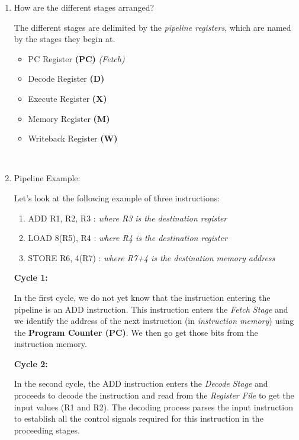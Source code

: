 \documentclass[12pt]{article}
\newenvironment{QandA}{\begin{enumerate}[label=\bfseries\arabic*.]\bfseries}
                      {\end{enumerate}}
\newenvironment{answered}{\par\quad\normalfont}{}
\begin{document}
\begin{QandA}
    \
    
    \item How are the different stages arranged?
    \begin{answered}
    The different stages are delimited by the \textit{pipeline registers}, which are named by the stages they begin at.
    \begin{itemize}
        \item PC Register \textbf{(PC)} \textit{(Fetch)}
        \item Decode Register \textbf{(D)}
        \item Execute Register \textbf{(X)}
        \item Memory Register \textbf{(M)}
        \item Writeback Register \textbf{(W)}
    \end{itemize}
    \end{answered}
    
    \ 
    
    \item Pipeline Example:
    \begin{answered}
    Let's look at the following example of three instructions:
    \begin{enumerate}
        \item ADD R1, R2, R3 : \textit{where R3 is the destination register}
        \item LOAD 8(R5), R4 : \textit{where R4 is the destination register}
        \item STORE R6, 4(R7) : \textit{where R7+4 is the destination memory address}
    \end{enumerate}
    
    \textbf{Cycle 1:} 
    
    In the first cycle, we do not yet know that the instruction entering the pipeline is an ADD instruction. This instruction enters the \textit{Fetch Stage} and we identify the address of the next instruction (in \textit{instruction memory}) using the \textbf{Program Counter (PC)}. We then go get those bits from the instruction memory.
    
    \textbf{Cycle 2:} 
    
    In the second cycle, the ADD instruction enters the \textit{Decode Stage} and proceeds to decode the instruction and read from the \textit{Register File} to get the input values (R1 and R2). The decoding process parses the input instruction to establish all the control signals required for this instruction in the proceeding stages.
    

\end{answered}
\end{QandA}
\end{document}
